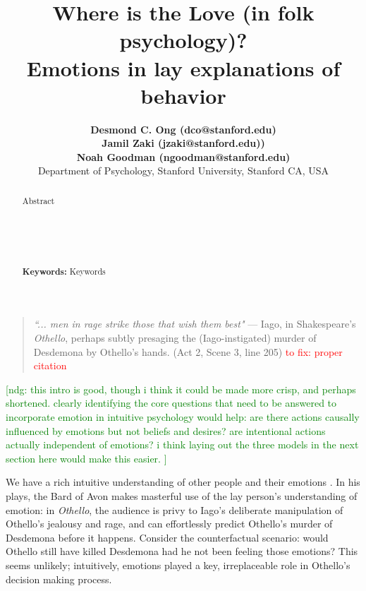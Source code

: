\documentclass[10pt,letterpaper]{article}
\title{ Where is the Love (in folk psychology)? \\ Emotions in lay explanations of behavior \ndg{the cute part is a stretch... how about just the second part?}}
\author{{\large \bf Desmond C. Ong (dco@stanford.edu)} \\
{\large \bf Jamil Zaki (jzaki@stanford.edu))} \\
{\large \bf Noah Goodman (ngoodman@stanford.edu)} \\
  Department of Psychology, Stanford University, Stanford CA, USA 
}
\newcommand{\red}[1]{\textcolor{Red}{#1}}
\newcommand{\ndg}[1]{\textcolor{Green}{[ndg: #1]}}
\begin{document}
\maketitle

\begin{abstract}
Abstract \\
\\
\\
\\
\\
\\


\textbf{Keywords:} 
Keywords
\end{abstract}









\begin{quote}
\textit{``... men in rage strike those that wish them best"} 
--- Iago, in Shakespeare's \textit{Othello}, perhaps subtly presaging the (Iago-instigated) murder of Desdemona by Othello's hands. (Act 2, Scene 3, line 205) \red{to fix: proper citation}
\end{quote}


\ndg{this intro is good, though i think it could be made more crisp, and perhaps shortened. clearly identifying the core questions that need to be answered to incorporate emotion in intuitive psychology would help: are there actions causally influenced by emotions but not beliefs and desires? are intentional actions actually independent of emotions? i think laying out the three models in the next section here would make this easier. }

We have a rich intuitive understanding of other people and their emotions \cite{Ong2015AffCog}. In his plays, the Bard of Avon makes masterful use of the lay person's understanding of emotion: in \textit{Othello}, the audience is privy to Iago's deliberate manipulation of Othello's jealousy and rage, and can effortlessly predict Othello's murder of Desdemona before it happens. Consider the counterfactual scenario: would Othello still have killed Desdemona had he not been feeling those emotions? This seems unlikely; intuitively, emotions played a key, irreplaceable role in Othello's decision making process.
\end{document}
